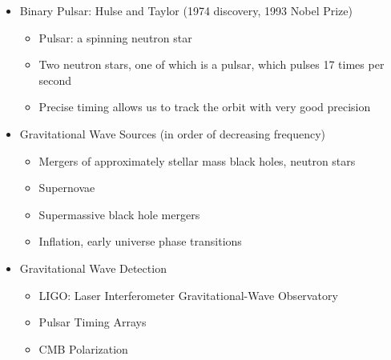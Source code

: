 \begin{itemize}
\begin{itemize}
    \end{itemize}

  \item Binary Pulsar: Hulse and Taylor (1974 discovery, 1993 Nobel Prize)

    \begin{itemize}

      \item Pulsar: a spinning neutron star

      \item Two neutron stars, one of which is a pulsar, which pulses 17 times per second

      \item Precise timing allows us to track the orbit with very good precision
        
    \end{itemize}

  \item Gravitational Wave Sources (in order of decreasing frequency)

    \begin{itemize}

      \item Mergers of approximately stellar mass black holes, neutron stars

      \item Supernovae

      \item Supermassive black hole mergers

      \item Inflation, early universe phase transitions

    \end{itemize}

  \item Gravitational Wave Detection

    \begin{itemize}

      \item LIGO: Laser Interferometer Gravitational-Wave Observatory

      \item Pulsar Timing Arrays

      \item CMB Polarization

    \end{itemize}

\end{itemize}



